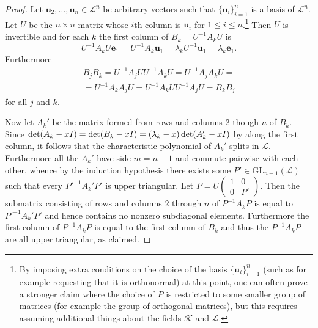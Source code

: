 \documentclass[12pt]{article}
\newcommand{\mc}{\mathcal}
\newcommand{\vek}{\mathbf}
\newcommand{\GL}{\mathrm{GL}}
\begin{document}
\begin{proof}
  Let \(\vek{u}_2,\dotsc,\vek{u}_n \in \mc{L}^n\) be arbitrary 
  vectors such that \(\{\vek{u}_i\}_{i=1}^n\) is a basis of 
  $\mc{L}^n$. Let $U$ be the $n \times n$ matrix whose $i$th column 
  is $\vek{u}_i$ for \(1 \leqslant i \leqslant n\).\footnote{By 
  imposing extra conditions on the choice of the basis 
  \(\{\vek{u}_i\}_{i=1}^n\) (such as for example requesting that 
  it is orthonormal) at this point, one can often prove a stronger 
  claim where the choice of $P$ is restricted to some smaller 
  group of matrices (for example the group of orthogonal 
  matrices), but this requires assuming additional things about 
  the fields $\mc{K}$ and $\mc{L}$.}
  Then $U$ is invertible and for each $k$ the first column of 
  \(B_k = U^{-1} A_k U\) is
  \begin{equation*}
    U^{-1} A_k U \vek{e}_1 =
    U^{-1} A_k \vek{u}_1 =
    \lambda_k U^{-1} \vek{u}_1 =
    \lambda_k \vek{e}_1
    \text{.}
  \end{equation*}
  Furthermore
  \begin{multline*}
    B_j B_k = U^{-1} A_j U U^{-1} A_k U =
    U^{-1} A_j A_k U = \\ = 
    U^{-1} A_k A_j U = 
    U^{-1} A_k U U^{-1} A_j U = B_k B_j
  \end{multline*}
  for all $j$ and $k$.
  
  
  Now let $A_k'$ be the matrix formed from rows and columns $2$ though 
  $n$ of $B_k$. Since \(\det(A_k -\nobreak xI) = 
  \det( B_k -\nobreak xI ) = (\lambda_k -\nobreak x) 
  \det( A_k' -\nobreak xI )\) by 
   along the first column, 
  it follows that the characteristic polynomial of $A_k'$ splits in 
  $\mc{L}$. Furthermore all the $A_k'$ have side \(m = n-1\) and 
  commute pairwise with each other, whence by the induction hypothesis 
  there exists some \(P' \in \GL_{n-1}(\mc{L})\) such that every 
  \(P'^{-1} A_k' P'\) is upper triangular. Let \(P = 
  U \left(\begin{smallmatrix} 1& 0 \\ 0& P' \end{smallmatrix}\right) 
  \). Then the submatrix consisting of rows and columns $2$ through 
  $n$ of $P^{-1} A_k P$ is equal to \(P'^{-1} A_k' P'\) and hence 
  contains no nonzero subdiagonal elements. Furthermore the first 
  column of $P^{-1} A_k P$ is equal to the first column of $B_k$ and 
  thus the $P^{-1} A_k P$ are all upper triangular, as claimed.
  

\end{proof}
\end{document}
